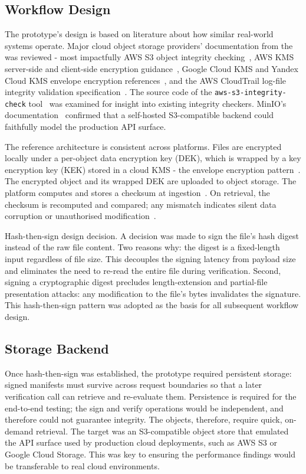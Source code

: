 \documentclass[12pt,a4paper]{article}
\begin{document}
\subsection{Workflow Design}

The prototype's design is based on literature about how similar real-world systems operate. Major cloud object storage providers' documentation from the was reviewed - most impactfully AWS S3 object integrity checking~\cite{Ama24b, Ama24c}, AWS KMS server-side and client-side encryption guidance~\cite{Ama24a, Ama24d}, Google Cloud KMS and Yandex Cloud KMS envelope encryption references~\cite{Goo24, Yan24}, and the AWS CloudTrail log-file integrity validation specification~\cite{Ama23}. The source code of the \texttt{aws-s3-integrity-check} tool~\cite{Ven+23} was examined for insight into existing integrity checkers. MinIO's documentation~\cite{minio-docs} confirmed that a self-hosted S3-compatible backend could faithfully model the production API surface.

The reference architecture is consistent across platforms. Files are encrypted locally under a per-object data encryption key (DEK), which is wrapped by a key encryption key (KEK) stored in a cloud KMS - the envelope encryption pattern~\cite{Ama24d, Goo24}. The encrypted object and its wrapped DEK are uploaded to object storage. The platform computes and stores a checksum at ingestion~\cite{Ama24a, Ama24b}. On retrieval, the checksum is recomputed and compared; any mismatch indicates silent data corruption or unauthorised modification~\cite{Ama24c, Ven+23}.

Hash-then-sign design decision. A decision was made to sign the file's hash digest instead of the raw file content. Two reasons why: the digest is a fixed-length input regardless of file size. This decouples the signing latency from payload size and eliminates the need to re-read the entire file during verification. Second, signing a cryptographic digest precludes length-extension and partial-file presentation attacks: any modification to the file's bytes invalidates the signature. This hash-then-sign pattern was adopted as the basis for all subsequent workflow design.

\subsection{Storage Backend}

Once hash-then-sign was established, the prototype required persistent storage: signed manifests must survive across request boundaries so that a later verification call can retrieve and re-evaluate them. Persistence is required for the end-to-end testing; the sign and verify operations would be independent, and therefore could not guarantee integrity. The objects, therefore, require quick, on-demand retrieval. The target was an S3-compatible object store that emulated the API surface used by production cloud deployments, such as AWS S3 or Google Cloud Storage. This was key to ensuring the performance findings would be transferable to real cloud environments.
\end{document}
